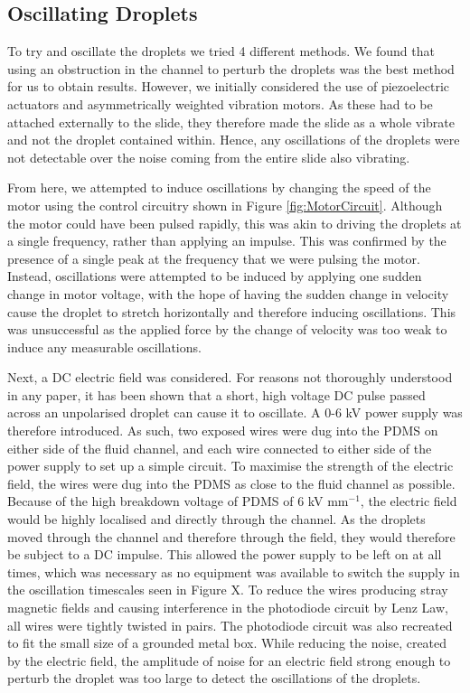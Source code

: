 \documentclass{physics_article_B}
\begin{document}
    \subsection{Oscillating Droplets}
      
        To try and oscillate the droplets we tried 4 different methods. We found that using an obstruction in the channel to perturb the droplets was the best method for us to obtain results. However, we initially considered the use of piezoelectric actuators and asymmetrically weighted vibration motors. As these had to be attached externally to the slide, they therefore made the slide as a whole vibrate and not the droplet contained within. Hence, any oscillations of the droplets were not detectable over the noise coming from the entire slide also vibrating.
        
        From here, we attempted to induce oscillations by changing the speed of the motor using the control circuitry shown in Figure \ref{fig:MotorCircuit}. Although the motor could have been pulsed rapidly, this was akin to driving the droplets at a single frequency, rather than applying an impulse. This was confirmed by the presence of a single peak at the frequency that we were pulsing the motor. Instead, oscillations were attempted to be induced by applying one sudden change in motor voltage, with the hope of having the sudden change in velocity cause the droplet to stretch horizontally and therefore inducing oscillations. This was unsuccessful as the applied force by the change of velocity was too weak to induce any measurable oscillations. 
        
        Next, a DC electric field was considered. For reasons not thoroughly understood in any paper, it has been shown that a short, high voltage DC pulse passed across an unpolarised droplet can cause it to oscillate. A 0-6 kV power supply was therefore introduced. As such, two exposed wires were dug into the PDMS on either side of the fluid channel, and each wire connected to either side of the power supply to set up a simple circuit. To maximise the strength of the electric field, the wires were dug into the PDMS as close to the fluid channel as possible. Because of the high breakdown voltage of PDMS\cite{PDMSBreakdown} of 6 kV mm$^{-1}$, the electric field would be highly localised and directly through the channel. As the droplets moved through the channel and therefore through the field, they would therefore be subject to a DC impulse. This allowed the power supply to be left on at all times, which was necessary as no equipment was available to switch the supply in the oscillation timescales seen in Figure X. To reduce the wires producing stray magnetic fields and causing interference in the photodiode circuit by Lenz Law, all wires were tightly twisted in pairs. The photodiode circuit was also recreated to fit the small size of a grounded metal box. While reducing the noise, created by the electric field, the amplitude of noise for an electric field strong enough to perturb the droplet was too large to detect the oscillations of the droplets.
        
\end{document}
